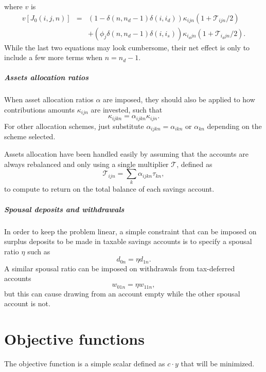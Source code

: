 \documentclass{report}[fleqn,12pt]
\begin{document}
where $v$ is
\begin{eqnarray}
	v[J_0(i, j, n)] 
	&=& (1 - \delta(n, n_d-1)\delta(i, i_d)) \kappa_{ijn}(1 + \mathcal{T}_{ijn}/2)
	\nonumber \\
	&& + (\phi_j\delta(n, n_d-1)\delta(i, i_s))\kappa_{i_djn}(1 + \mathcal{T}_{i_djn}/2). 
\end{eqnarray}
While the last two equations may look cumbersome, their net effect is only to include
a few more terms when $n=n_d-1$. 

\paragraph*{Assets allocation ratios}
When asset allocation ratios $\alpha$ are imposed,
they should also be applied to how
contributions amounts $\kappa_{ijn}$ are invested, such that 
\begin{equation}
	\kappa_{ijkn} = \alpha_{ijkn} \kappa_{ijn}.
\end{equation}
For other allocation schemes, just substitute $\alpha_{ijkn} = \alpha_{ikn}$ or $\alpha_{kn}$
depending on the scheme selected.

Assets allocation have been handled easily by assuming that
the accounts are always rebalanced
and only using a single multiplier $\mathcal{T}$, defined as
\begin{equation}
	\mathcal{T}_{ijn} = \sum_k \alpha_{ijkn}\tau_{kn},
\end{equation}
to compute to return
on the total balance of each savings account.

\paragraph*{Spousal deposits and withdrawals}
In order to keep the problem linear, a simple constraint that can be imposed on
surplus deposits to be made in taxable savings accounts is to specify a spousal ratio $\eta$
such as
\begin{equation}
	d_{0n} = \eta d_{1n}.
\end{equation}
A similar spousal ratio can be imposed on withdrawals from tax-deferred accounts
\begin{equation}
	w_{01n} = \eta w_{11n},
\end{equation}
but this can cause drawing from an account empty while the other spousal account is not.

\chapter{Objective functions}
The objective function is a simple scalar defined as $c\cdot y$ that will be minimized.
\end{document}
